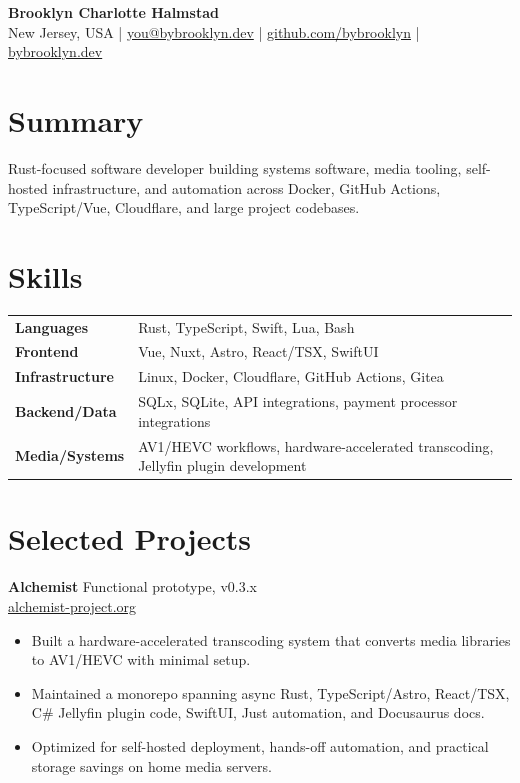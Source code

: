 \documentclass[10pt,letterpaper]{article}
\newcommand{\resumeItem}[1]{\item #1}
\newcommand{\projectHeading}[3]{%
  \textbf{#1} \hfill {\small #2}\\[-1pt]
  {\small #3}
}
\newcommand{\contactSep}{\quad|\quad}
\begin{document}
\fontsize{10}{11}\selectfont

{\LARGE \textbf{Brooklyn Charlotte Halmstad}}\\[1pt]
{\small
New Jersey, USA
\contactSep
\href{mailto:you@bybrooklyn.dev}{you@bybrooklyn.dev}
\contactSep
\href{https://github.com/bybrooklyn}{github.com/bybrooklyn}
\contactSep
\href{https://bybrooklyn.dev}{bybrooklyn.dev}
}

\section{Summary}
Rust-focused software developer building systems software, media tooling, self-hosted infrastructure, and automation across Docker, GitHub Actions, TypeScript/Vue, Cloudflare, and large project codebases.

\section{Skills}
\begin{tabularx}{\textwidth}{@{}>{\bfseries\arraybackslash}p{1.22in} X@{}}
Languages & Rust, TypeScript, Swift, Lua, Bash \\[1pt]
Frontend & Vue, Nuxt, Astro, React/TSX, SwiftUI \\[1pt]
Infrastructure & Linux, Docker, Cloudflare, GitHub Actions, Gitea \\[1pt]
Backend/Data & SQLx, SQLite, API integrations, payment processor integrations \\[1pt]
Media/Systems & AV1/HEVC workflows, hardware-accelerated transcoding, Jellyfin plugin development \\
\end{tabularx}

\section{Selected Projects}

\projectHeading{Alchemist}{Functional prototype, v0.3.x}{\href{https://alchemist-project.org}{alchemist-project.org}}
\begin{itemize}
  \resumeItem{Built a hardware-accelerated transcoding system that converts media libraries to AV1/HEVC with minimal setup.}
  \resumeItem{Maintained a monorepo spanning async Rust, TypeScript/Astro, React/TSX, C\# Jellyfin plugin code, SwiftUI, Just automation, and Docusaurus docs.}
  \resumeItem{Optimized for self-hosted deployment, hands-off automation, and practical storage savings on home media servers.}
\end{itemize}
\end{document}
